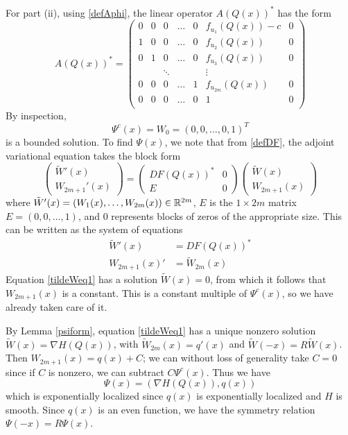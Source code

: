 \documentclass[thesis.tex]{subfiles}
\begin{document}
For part (ii), using \eqref{defAphi}, the linear operator $A(Q(x))^*$ has the form 
\begin{equation}\label{defAphi2}
A(Q(x))^* = 
\begin{pmatrix}
0 & 0 & 0 & \dots & 0 & f_{u_1}(Q(x)) - c & 0 \\
1 & 0 & 0 & \dots & 0 & f_{u_2}(Q(x)) & 0 \\
0 & 1 & 0 & \dots & 0 & f_{u_3}(Q(x)) & 0 \\
&& \ddots &&& \vdots \\
0 & 0 & 0 & \dots & 1 & f_{u_{2m}}(Q(x)) & 0 \\
0 & 0 & 0 & \dots & 0 & 1 & 0 \\
\end{pmatrix}
\end{equation}
By inspection, 
\[
\Psi^c(x) = W_0 = (0, 0, \dots, 0, 1)^T
\]
is a bounded solution. To find $\Psi(x)$, we note that from \eqref{defDF}, the adjoint variational equation takes the block form
\[
\begin{pmatrix} \tilde{W}'(x) \\ W_{2m+1}'(x) \end{pmatrix}
= 
\begin{pmatrix}DF(Q(x))^* & 0 \\ E & 0 \end{pmatrix}\begin{pmatrix} \tilde{W}(x) \\ W_{2m+1}(x) \end{pmatrix}
\]
where $\tilde{W}'(x) = (W_1(x), \dots, W_{2m}(x)) \in \mathbb{R}^{2m}$, $E$ is the $1 \times 2m$ matrix $E = (0, 0, \dots, 1)$, and $0$ represents blocks of zeros of the appropriate size. This can be written as the system of equations
\begin{align}
\tilde{W}'(x) &= DF(Q(x))^* \label{tildeWeq1} \\
W_{2m+1}(x)' &= \tilde{W}_{2m}(x) \label{tildeWeq2}
\end{align}
Equation \eqref{tildeWeq1} has a solution $\tilde{W}(x) = 0$, from which it follows that $W_{2m+1}(x)$ is a constant. This is a constant multiple of $\Psi^c(x)$, so we have already taken care of it.

By Lemma \ref{psiform}, equation \eqref{tildeWeq1} has a unique nonzero solution $\tilde{W}(x) = \nabla H(Q(x))$, with $\tilde{W}_{2m}(x)=q'(x)$ and $\tilde{W}(-x) = R\tilde{W}(x)$. Then $W_{2m+1}(x) = q(x) + C$; we can without loss of generality take $C = 0$ since if $C$ is nonzero, we can subtract $C \Psi^c(x)$. Thus we have
\[
\Psi(x) = ( \nabla H(Q(x)), q(x) )
\]
which is exponentially localized since $q(x)$ is exponentially localized and $H$ is smooth. Since $q(x)$ is an even function, we have the symmetry relation $\Psi(-x) = R \Psi(x)$.
\end{document}
